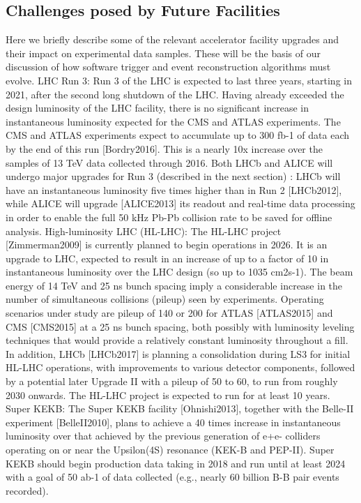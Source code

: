 \subsection{Challenges posed by Future Facilities }

Here we briefly describe some of the relevant accelerator facility upgrades and their impact on experimental data samples. These will be the basis of our discussion of how software trigger and event reconstruction algorithms must evolve.
LHC Run 3: Run 3 of the LHC is expected to last three years, starting in 2021, after the second long shutdown of the LHC. Having already exceeded the design luminosity of the LHC facility, there is no significant increase in instantaneous luminosity expected for the CMS and ATLAS experiments. The CMS and ATLAS experiments expect to accumulate up to 300 fb-1 of data each by the end of this run [Bordry2016]. This is a nearly 10x increase over the samples of 13 TeV data collected through 2016. Both LHCb and ALICE will undergo major upgrades for Run 3 (described in the next section) : LHCb will have an instantaneous luminosity five times higher than in Run 2 [LHCb2012], while ALICE will upgrade [ALICE2013] its readout and real-time data processing in order to enable the full 50 kHz Pb-Pb collision rate to be saved for offline analysis.
High-luminosity LHC (HL-LHC): The HL-LHC project [Zimmerman2009] is currently planned to begin operations in 2026. It is an upgrade to LHC, expected to result in an increase of up to a factor of 10 in instantaneous luminosity over the LHC design (so up to 1035 cm2s-1). The beam energy of 14 TeV and 25 ns bunch spacing imply a considerable increase in the number of simultaneous collisions (pileup) seen by experiments. Operating scenarios under study are pileup of 140 or 200 for ATLAS [ATLAS2015] and CMS [CMS2015] at a 25 ns bunch spacing, both possibly with luminosity leveling techniques that would provide a relatively constant luminosity throughout a fill. In addition, LHCb [LHCb2017] is planning a consolidation during LS3 for initial HL-LHC operations, with improvements to various detector components, followed by a potential later Upgrade II with a pileup of 50 to 60, to run from roughly 2030 onwards. The HL-LHC project is expected to run for at least 10 years. 
Super KEKB: The Super KEKB facility [Ohnishi2013], together with the Belle-II experiment [BelleII2010], plans to achieve a 40 times increase in instantaneous luminosity over that achieved by the previous generation of e+e- colliders operating on or near the Upsilon(4S) resonance (KEK-B and PEP-II). Super KEKB should begin production data taking in 2018 and run until at least 2024 with a goal of 50 ab-1 of data collected (e.g., nearly 60 billion B-B pair events recorded). 
